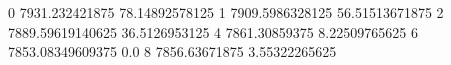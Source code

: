 0 7931.232421875 78.14892578125
1 7909.5986328125 56.51513671875
2 7889.59619140625 36.5126953125
4 7861.30859375 8.22509765625
6 7853.08349609375 0.0
8 7856.63671875 3.55322265625
